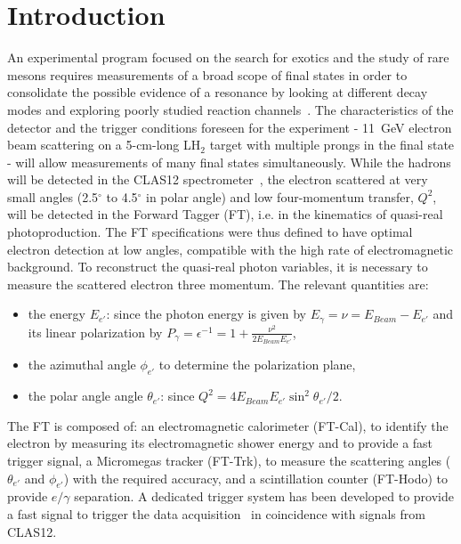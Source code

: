 \section{Introduction}

An experimental program focused on the search for exotics and the study of rare mesons requires measurements
of a broad scope of final states in order to consolidate the possible evidence of a resonance by looking at different
decay modes and exploring poorly studied reaction channels~\cite{mesonex}. The characteristics of the detector
and the trigger conditions foreseen for the experiment - 11~GeV electron beam scattering on a 5-cm-long LH$_2$
target with multiple prongs in the final state - will allow  measurements of many final states simultaneously. While
the hadrons will be detected in the CLAS12 spectrometer~\cite{overview}, the electron scattered at very small
angles (2.5$^\circ$ to 4.5$^\circ$ in polar angle) and low four-momentum transfer, $Q^2$,  will be detected in the
Forward Tagger (FT), i.e. in the kinematics of quasi-real photoproduction. The FT  specifications were thus defined
to have optimal electron detection at low angles, compatible with the high rate of electromagnetic background. To
reconstruct the  quasi-real photon variables, it is necessary to measure the scattered electron three momentum.
The relevant quantities are:

\begin{itemize}
\item the energy $E_{e'}$: since the photon energy is given by $E_\gamma =\nu=E_{Beam}-E_{e'}$ and its linear
  polarization by $P_\gamma=\epsilon^{-1}=1+\frac{\nu^2}{2 E_{Beam} E_{e'}}$,
\item the azimuthal angle $\phi_{e'}$ to determine the polarization plane, 
\item the polar angle angle $\theta_{e'}$: since $Q^2 = 4 E_{Beam} E_{e'} \sin^2{\theta_{e'}/2}$.
\end{itemize}

The FT is composed of: an electromagnetic calorimeter  (FT-Cal), to identify the electron by measuring its
electromagnetic shower energy and to provide a fast trigger signal, a Micromegas tracker (FT-Trk), to measure
the scattering angles ($\theta_{e'}$ and $\phi_{e'}$) with the required accuracy, and a  scintillation counter
(FT-Hodo) to provide $e/\gamma$ separation. A dedicated trigger system has been developed to provide a fast
signal to trigger the data acquisition~\cite{daq} in coincidence with signals from CLAS12.

